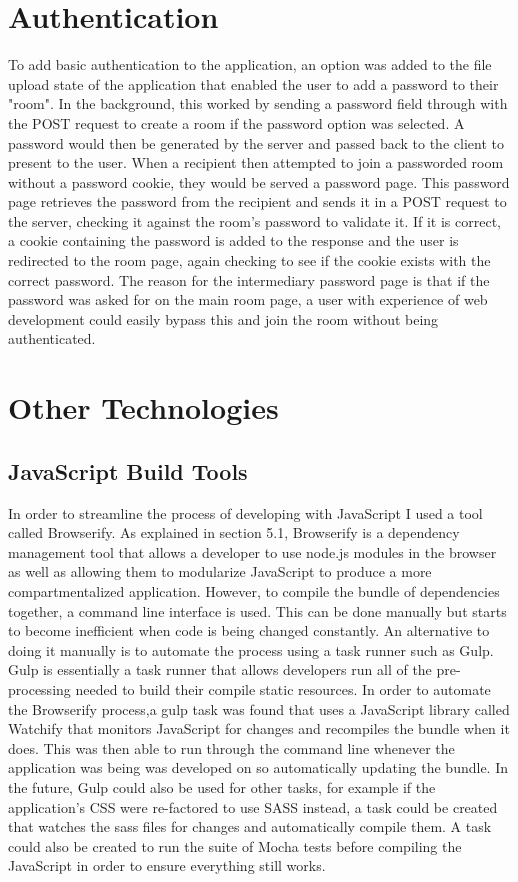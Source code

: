 \documentclass[]{report}
\begin{document}
		\section{Authentication}
		To add basic authentication to the application, an option was added to the file upload state of the application that enabled the user to add a password to their "room". In the background, this worked by sending a password field through with the POST request to create a room if the password option was selected. A password would then be generated by the server and passed back to the client to present to the user. When a recipient then attempted to join a passworded room without a password cookie, they would be served a password page. This password page retrieves the password from the recipient and sends it in a POST request to the server, checking it against the room's password to validate it. If it is correct, a cookie containing the password is added to the response and the user is redirected to the room page, again checking to see if the cookie exists with the correct password. The reason for the intermediary password page is that if the password was asked for on the main room page, a user with experience of web development could easily bypass this and join the room without being authenticated.
		
		\section{Other Technologies}
			\subsection{JavaScript Build Tools}
			In order to streamline the process of developing with JavaScript I used a tool called Browserify. As explained in section 5.1, Browserify is a dependency management tool that allows a developer to use node.js modules in the browser as well as allowing them to modularize JavaScript to produce a more compartmentalized application. However, to compile the bundle of dependencies together, a command line interface is used. This can be done manually but starts to become inefficient when code is being changed constantly. An alternative to doing it manually is to automate the process using a task runner such as Gulp. Gulp is essentially a task runner that allows developers run all of the pre-processing needed to build their compile static resources. In order to automate the Browserify process,a gulp task was found that uses a JavaScript library called Watchify that monitors JavaScript for changes and recompiles the bundle when it does. This was then able to run through the command line whenever the application was being was developed on so automatically updating the bundle. In the future, Gulp could also be used for other tasks, for example if the application's CSS were re-factored to use SASS instead, a task could be created that watches the sass files for changes and automatically compile them. A task could also be created to run the suite of Mocha tests before compiling the JavaScript in order to ensure everything still works.
			
\end{document}
